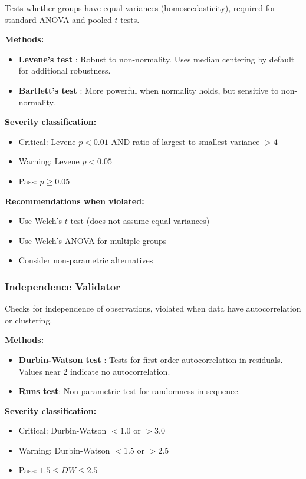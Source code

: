 \documentclass[article]{jss}
\begin{document}
Tests whether groups have equal variances (homoscedasticity), required for standard ANOVA and pooled $t$-tests.

\textbf{Methods:}
\begin{itemize}
\item \textbf{Levene's test} \citep{levene1960robust}: Robust to non-normality. Uses median centering by default for additional robustness.
\item \textbf{Bartlett's test} \citep{bartlett1937properties}: More powerful when normality holds, but sensitive to non-normality.
\end{itemize}

\textbf{Severity classification:}
\begin{itemize}
\item Critical: Levene $p < 0.01$ AND ratio of largest to smallest variance $> 4$
\item Warning: Levene $p < 0.05$
\item Pass: $p \geq 0.05$
\end{itemize}

\textbf{Recommendations when violated:}
\begin{itemize}
\item Use Welch's $t$-test (does not assume equal variances)
\item Use Welch's ANOVA for multiple groups
\item Consider non-parametric alternatives
\end{itemize}

\subsubsection{Independence Validator}

Checks for independence of observations, violated when data have autocorrelation or clustering.

\textbf{Methods:}
\begin{itemize}
\item \textbf{Durbin-Watson test} \citep{durbin1951testing}: Tests for first-order autocorrelation in residuals. Values near 2 indicate no autocorrelation.
\item \textbf{Runs test}: Non-parametric test for randomness in sequence.
\end{itemize}

\textbf{Severity classification:}
\begin{itemize}
\item Critical: Durbin-Watson $< 1.0$ or $> 3.0$
\item Warning: Durbin-Watson $< 1.5$ or $> 2.5$
\item Pass: $1.5 \leq DW \leq 2.5$
\end{itemize}
\end{document}
